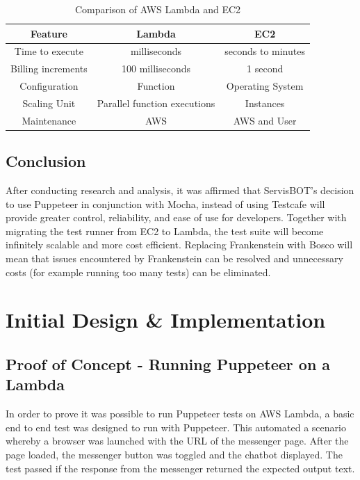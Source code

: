 \documentclass[12pt,a4paper,titlepage]{report}
\begin{document}
\begin{table}[ht]
  \centering
  \small
  \setlength\tabcolsep{6pt}
  \begin{tabular}{|c|c|c|}
   \hline
   \textbf{Feature} & \textbf{Lambda} & \textbf{EC2}\\
   \hline\hline
   Time to execute&milliseconds&seconds to minutes\\
   \hline
   Billing increments& 100 milliseconds&1 second\\
   \hline
   Configuration&Function& Operating System\\
   \hline
   Scaling Unit&Parallel function executions&Instances\\
   \hline
   Maintenance& AWS&AWS and User\\
   \hline
  \end{tabular}
  \caption{Comparison of AWS Lambda and EC2 \autocite{inbook}}
 \end{table}

\section{Conclusion}
After conducting research and analysis, it was affirmed that ServisBOT's decision to use Puppeteer in conjunction 
with Mocha, instead of using Testcafe will provide greater control, reliability, and ease of use for developers. 
Together with migrating the test runner from EC2 to Lambda, the test suite will become infinitely scalable and 
more cost efficient. Replacing Frankenstein with Bosco will mean that issues encountered by Frankenstein can be resolved and unnecessary costs (for 
example running too many tests) can be eliminated.

\chapter{Initial Design \& Implementation}

\section{Proof of Concept - Running Puppeteer on a Lambda}

In order to prove it was possible to run Puppeteer tests on AWS Lambda, a basic end to end test was designed
to run with Puppeteer. This automated a scenario whereby a browser was launched with the URL of the
messenger page. After the page loaded, the messenger button was toggled and the chatbot displayed. The test
passed if the response from the messenger returned the expected output text.
\end{document}
